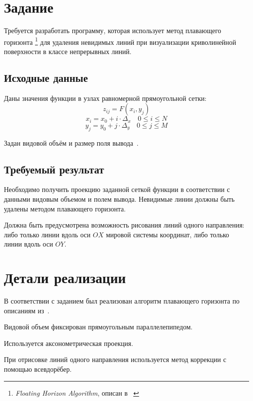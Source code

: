 \documentclass[a4paper,10pt]{article}
\begin{document}




\section{Задание}
Требуется разработать программу, которая использует метод плавающего горизонта%
\footnote{\textit{Floating Horizon Algorithm}, описан в~%
\cite{rogers1989procelemsforcg, shikin1995cg, skala1985bresenhemmodif, ilyin2006task1}}
для удаления невидимых линий при визуализации криволинейной поверхности в классе непрерывных линий.

\subsection{Исходные данные}
Даны значения функции в узлах равномерной прямоугольной сетки:
$$ z_{ij} = F(x_i, y_j) $$
$$ x_i = x_0 + i \cdot \Delta_x \quad 0 \leqslant i \leqslant N $$
$$ y_j = y_0 + j \cdot \Delta_y \quad 0 \leqslant j \leqslant M $$

Задан видовой объём и размер поля вывода~\cite{ilyin2006task1}.

\subsection{Требуемый результат}
Необходимо получить проекцию заданной сеткой функции в соответствии с данными видовым объемом и полем вывода.
Невидимые линии должны быть удалены методом плавающего горизонта.

Должна быть предусмотрена возможность рисования линий одного направления: 
либо только линии вдоль оси $OX$ мировой системы координат, 
либо только линии вдоль оси $OY$.

\section{Детали реализации}
В соответствии с заданием был реализован алгоритм плавающего горизонта 
по описаниям из~\cite{rogers1989procelemsforcg, shikin1995cg, skala1985bresenhemmodif, ilyin2006task1}.

Видовой объем фиксирован прямоугольным параллелепипедом. 

Используется аксонометрическая проекция.

При отрисовке линий одного направления используется метод коррекции с помощью всевдорёбер.
\end{document}
